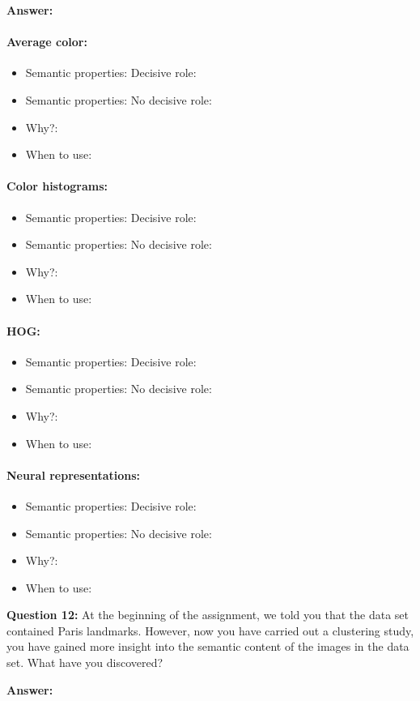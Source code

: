 \documentclass[11pt]{article}
\begin{document}
\textbf{Answer:}
\paragraph{Average color:}
\begin{itemize}
\item Semantic properties: Decisive role:

\item Semantic properties: No decisive role:

\item Why?:

\item When to use:
\end{itemize}

\paragraph{Color histograms:}
\begin{itemize}
\item Semantic properties: Decisive role:

\item Semantic properties: No decisive role:

\item Why?:

\item When to use:
\end{itemize}

\paragraph{HOG:}
\begin{itemize}
\item Semantic properties: Decisive role:

\item Semantic properties: No decisive role:

\item Why?:

\item When to use:
\end{itemize}

\paragraph{Neural representations:}
\begin{itemize}
\item Semantic properties: Decisive role:

\item Semantic properties: No decisive role:

\item Why?:

\item When to use:
\end{itemize}


\noindent\textbf{Question 12:} At the beginning of the assignment, we told you that the data set contained Paris landmarks. However, now you have carried out a clustering study, you have gained more insight into the semantic content of the images in the data set. What have you discovered?

\textbf{Answer:}
\end{document}
